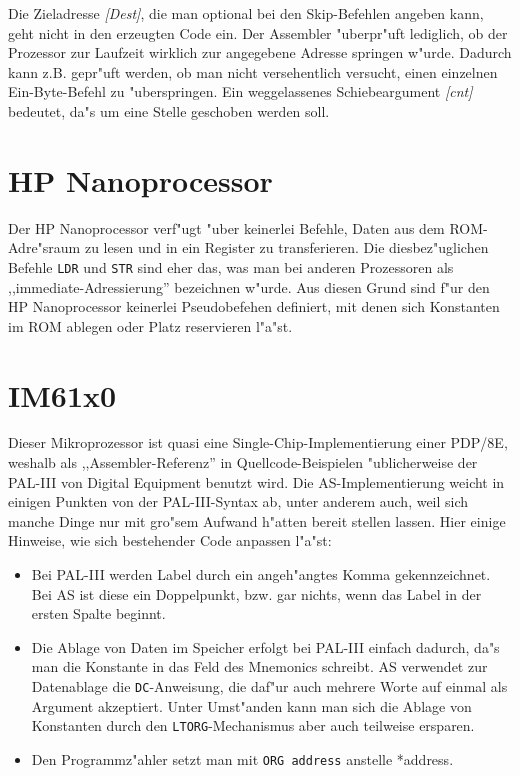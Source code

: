 \documentclass[12pt,a4paper,twoside]{report}
\newcommand{\tty}[1]{{\tt #1}}
\begin{document}
Die Zieladresse {\it [Dest]}, die man optional bei den Skip-Befehlen angeben
kann, geht nicht in den erzeugten Code ein.  Der Assembler "uberpr"uft lediglich,
ob der Prozessor zur Laufzeit wirklich zur angegebene Adresse springen w"urde.
Dadurch kann z.B. gepr"uft werden, ob man nicht versehentlich versucht, einen
einzelnen Ein-Byte-Befehl zu "uberspringen.  Ein weggelassenes Schiebeargument
{\it [cnt]} bedeutet, da"s um eine Stelle geschoben werden soll.


\section{HP Nanoprocessor}

Der HP Nanoprocessor verf"ugt "uber keinerlei Befehle, Daten aus dem ROM-
Adre"sraum zu lesen und in ein Register zu transferieren.  Die diesbez"uglichen
Befehle {\tt LDR} und {\tt STR} sind eher das, was man bei anderen Prozessoren
als ,,immediate-Adressierung'' bezeichnen w"urde.  Aus diesen Grund sind f"ur
den HP Nanoprocessor keinerlei Pseudobefehen definiert, mit denen sich Konstanten
im ROM ablegen oder Platz reservieren l"a"st.


\section{IM61x0}

Dieser Mikroprozessor ist quasi eine Single-Chip-Implementierung einer PDP/8E,
weshalb als ,,Assembler-Referenz'' in Quellcode-Beispielen "ublicherweise der
PAL-III von Digital Equipment benutzt wird.  Die AS-Implementierung weicht in
einigen Punkten von der PAL-III-Syntax ab, unter anderem auch, weil sich manche
Dinge nur mit gro"sem Aufwand h"atten bereit stellen lassen.  Hier einige Hinweise,
wie sich bestehender Code anpassen l"a"st:

\begin{itemize}
\item{Bei PAL-III werden Label durch ein angeh"angtes Komma gekennzeichnet.
      Bei AS ist diese ein Doppelpunkt, bzw. gar nichts, wenn das Label in der
      ersten Spalte beginnt.}
\item{Die Ablage von Daten im Speicher erfolgt bei PAL-III einfach dadurch,
      da"s man die Konstante in das Feld des Mnemonics schreibt.  AS verwendet
      zur Datenablage die \tty{DC}-Anweisung, die daf"ur auch mehrere Worte
      auf einmal als Argument akzeptiert.  Unter Umst"anden kann man sich
      die Ablage von Konstanten durch den \tty{LTORG}-Mechanismus aber auch
      teilweise ersparen.}
\item{Den Programmz"ahler setzt man mit \tty{ORG address} anstelle {*address}.}
\end{itemize}
\end{document}
